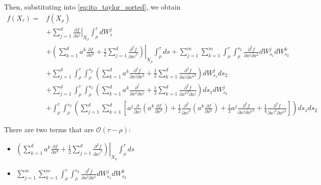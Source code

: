 \documentclass[12pt]{article}
\begin{document}
Then, substituting into \eqref{eq:ito_taylor_sorted}, we obtain
\begin{equation}
\begin{aligned}
f( X_\tau) = & f( X_\rho) \\
&+ \sum_{j=1}^d \left. \frac{\partial f}{\partial x^j} \right|_{X_\rho}  \int_{\rho}^{\tau}  dW_s^j \\ &
+  \left. \left( \sum_{k=1}^d a^k \frac{\partial f}{\partial x^k} + \frac{1}{2} \sum_{j=1}^d \frac{\partial^2 f}{\partial {x^j}^2} \right) \right|_{X_\rho} \int_{\rho}^{\tau} ds + \sum_{j=1}^m \sum_{k=1}^m \int_{\rho}^{\tau} \int_{\rho}^{s_2} \frac{\partial^2 f}{\partial x^j \partial x^k} dW_{s_1}^j dW_{s_2}^k \\
& + \sum_{j=1}^d  \int_{\rho}^{\tau} \int_{\rho}^{s_2} \left( \sum_{k=1}^d a^k \frac{\partial^2 f}{\partial x^j \partial x^k} + \frac{1}{2} \sum_{k=1}^d \frac{\partial^3 f}{\partial x^j \partial {x^k}^2} \right) dW_{s_1}^j ds_2 \\
& + \sum_{j=1}^d  \int_{\rho}^{\tau} \int_{\rho}^{s_2} \left( \sum_{k=1}^d a^k \frac{\partial^ f}{\partial x^k \partial x^j} + \frac{1}{2} \sum_{k=1}^d  \frac{\partial^3 f}{\partial {x^k}^2 \partial x^j} \right) ds_1 dW_{s_2}^j  \\
& + \int_{\rho}^{\tau} \int_{\rho}^{s_2} \left( \sum_{j=1}^d \sum_{k=1}^d \left[ a^j \frac{\partial}{\partial x^j}\left( a^k \frac{\partial f}{\partial x^k} \right) + \frac{1}{2} \frac{\partial^2}{\partial {x^j}^2} \left( a^k \frac{\partial f}{\partial x^k} \right) + \frac{1}{2} a^j \frac{\partial^3 f}{\partial x^j \partial {x^k}^2} + \frac{1}{4} \frac{\partial^4 f}{\partial {x^j}^2 \partial {x^k}^2} \right] \right)  ds_1 ds_2
\end{aligned}
\end{equation}

There are two terms that are $\mathcal{O}(\tau - \rho)$:
\begin{itemize}
\item $\left. \left( \sum_{k=1}^d a^k \frac{\partial f}{\partial x^k} + \frac{1}{2} \sum_{j=1}^d \frac{\partial^2 f}{\partial {x^j}^2} \right) \right|_{X_\rho} \int_{\rho}^{\tau} ds $
\item $ \sum_{j=1}^m \sum_{k=1}^m \int_{\rho}^{\tau} \int_{\rho}^{s_2} \frac{\partial^2 f}{\partial x^j \partial x^k} dW_{s_1}^j dW_{s_2}^k $
\end{itemize}
\end{document}
